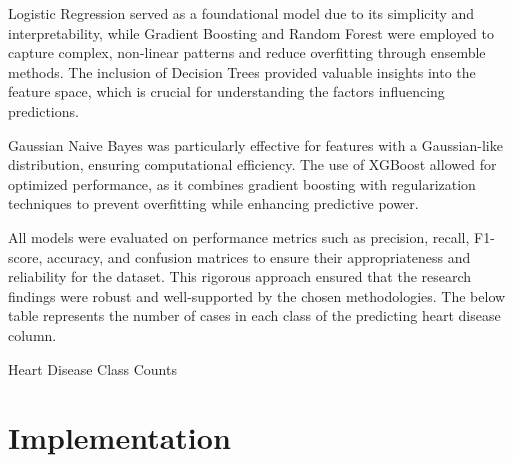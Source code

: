 \documentclass[pdflatex,sn-nature,Numbered]{sn-jnl}%
\theoremstyle{thmstyleone}%
\theoremstyle{thmstyletwo}%
\theoremstyle{thmstylethree}%
\begin{document}
Logistic Regression served as a foundational model due to its simplicity and interpretability, while Gradient Boosting and Random Forest were employed to capture complex, non-linear patterns and reduce overfitting through ensemble methods. The inclusion of Decision Trees provided valuable insights into the feature space, which is crucial for understanding the factors influencing predictions.

Gaussian Naive Bayes was particularly effective for features with a Gaussian-like distribution, ensuring computational efficiency. The use of XGBoost allowed for optimized performance, as it combines gradient boosting with regularization techniques to prevent overfitting while enhancing predictive power.

All models were evaluated on performance metrics such as precision, recall, F1-score, accuracy, and confusion matrices to ensure their appropriateness and reliability for the dataset. This rigorous approach ensured that the research findings were robust and well-supported by the chosen methodologies. The below table  represents the number of cases in each class of the predicting heart disease column.


\begin{table}[h] 
\label{table:heart}
\caption{Heart Disease Class Counts}  %
\end{table}

\section{Implementation}
\end{document}

